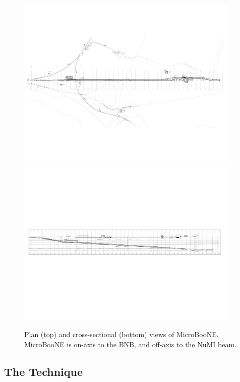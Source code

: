 \begin{figure}
\centering 
\includegraphics[width=0.95\textwidth]{figures/current_long_plot-PLAN.pdf}
\includegraphics[width=0.95\textwidth]{figures/current_long_plot-SECTION.pdf}
\caption{Plan (top) and cross-sectional (bottom) views of MicroBooNE.  MicroBooNE is on-axis to the BNB, and off-axis to the NuMI beam.}
\label{fnalmap}
\end{figure}


\subsection{The \lartpc Technique}

